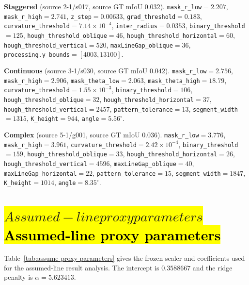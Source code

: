 \documentclass[a4paper,fleqn]{cas-dc}
\let\texthl\hl
\renewcommand{\hl}[1]{\ifmmode\colorbox{yellow}{\ensuremath{#1}}\else\texthl{#1}\fi}
\begin{document}
\begin{hlbox}
\small
\noindent\textbf{Staggered} (source 2-1/s017, source GT mIoU $0.032$).
\texttt{mask\_r\_low}$=2.207$,
\texttt{mask\_r\_high}$=2.741$,
\texttt{z\_step}$=0.00633$,
\texttt{grad\_threshold}$=0.183$,
\texttt{curvature\_threshold}$=7.14\times10^{-4}$,
\texttt{inter\_radius}$=0.0353$,
\texttt{binary\_threshold}$=125$,
\texttt{hough\_threshold\_oblique}$=46$,
\texttt{hough\_threshold\_horizontal}$=60$,
\texttt{hough\_threshold\_vertical}$=520$,
\texttt{maxLineGap\_oblique}$=36$,
\texttt{processing.y\_bounds}$=[4003,13100]$.

\medskip
\noindent\textbf{Continuous} (source 3-1/s030, source GT mIoU $0.042$).
\texttt{mask\_r\_low}$=2.756$,
\texttt{mask\_r\_high}$=2.906$,
\texttt{mask\_theta\_low}$=2.063$,
\texttt{mask\_theta\_high}$=18.79$,
\texttt{curvature\_threshold}$=1.55\times10^{-3}$,
\texttt{binary\_threshold}$=106$,
\texttt{hough\_threshold\_oblique}$=32$,
\texttt{hough\_threshold\_horizontal}$=37$,
\texttt{hough\_threshold\_vertical}$=2457$,
\texttt{pattern\_tolerance}$=13$,
\texttt{segment\_width}$=1315$,
\texttt{K\_height}$=944$,
\texttt{angle}$=5.56^{\circ}$.

\medskip
\noindent\textbf{Complex} (source 5-1/g001, source GT mIoU $0.036$).
\texttt{mask\_r\_low}$=3.776$,
\texttt{mask\_r\_high}$=3.961$,
\texttt{curvature\_threshold}$=2.42\times10^{-4}$,
\texttt{binary\_threshold}$=159$,
\texttt{hough\_threshold\_oblique}$=33$,
\texttt{hough\_threshold\_horizontal}$=26$,
\texttt{hough\_threshold\_vertical}$=4596$,
\texttt{maxLineGap\_oblique}$=40$,
\texttt{maxLineGap\_horizontal}$=22$,
\texttt{pattern\_tolerance}$=15$,
\texttt{segment\_width}$=1847$,
\texttt{K\_height}$=1014$,
\texttt{angle}$=8.35^{\circ}$.
\end{hlbox}

\section{\hl{Assumed-line proxy parameters}}\label{app:assume-proxy}

\begin{hlbox}
Table~\ref{tab:assume-proxy-parameters} gives the frozen scaler and coefficients used for the assumed-line result analysis. The intercept is $0.3588667$ and the ridge penalty is $\alpha=5.623413$.
\end{hlbox}
\end{document}
